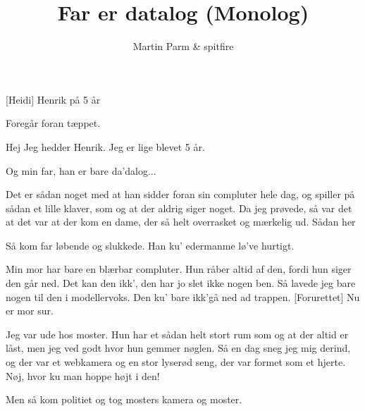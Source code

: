 \documentclass[a4paper]{article}
\title{Far er datalog (Monolog)}
\author{Martin Parm \& spitfire}
\begin{document}
\maketitle

\begin{roles}
[Heidi] Henrik på 5 år
\end{roles}

\begin{props}
\end{props}

\begin{sketch}
\scene Foregår foran tæppet.


 Hej  Jeg hedder Henrik. Jeg er lige blevet 5 år.

 Og min far, han er bare da'dalog...

 Det er sådan noget med at han sidder foran sin compluter hele
dag, og spiller på sådan et lille klaver, som og at der aldrig siger
noget. Da jeg prøvede, så var det at det var at der kom en dame, der
så helt overrasket og mærkelig ud. Sådan her 

 Så kom far løbende og slukkede. Han ku' edermanme lø've
hurtigt.

 Min mor har bare en blærbar compluter. Hun råber altid af
den, fordi hun siger den går ned.  Det kan den ikk',
den har jo slet ikke nogen ben.  Så lavede jeg bare
nogen til den i modellervoks.   Den ku' bare ikk'gå
ned ad trappen.  [Forurettet] Nu er mor sur.


 Jeg var ude hos moster. Hun har et sådan helt stort rum som
og at der altid er låst, men  jeg ved godt hvor hun
gemmer nøglen. Så en dag sneg jeg mig derind, og der var et webkamera
og en stor lyserød seng, der var formet som et hjerte. 
Nøj, hvor ku man hoppe højt i den!

 Men så kom politiet og tog mosters kamera  og
moster.


\end{sketch}
\end{document}
